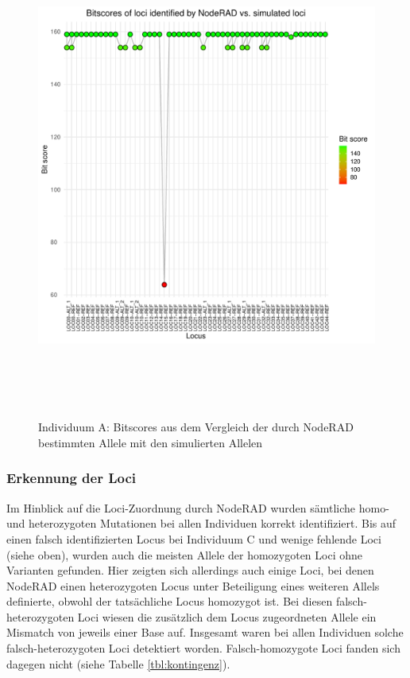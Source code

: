 \begin{figure}[H]
	\begin{center}
		\includegraphics[height=16cm]{bilder/evaluation/bitscores/A.plot_bitscores.pdf}
		\caption{Individuum A: Bitscores aus dem Vergleich der durch NodeRAD bestimmten Allele mit den simulierten Allelen}
		\label{fig:a-bitscore}
	\end{center}
\end{figure}

\subsubsection{Erkennung der Loci} \label{subsubsec:res_loci}
Im Hinblick auf die Loci-Zuordnung durch NodeRAD wurden sämtliche homo- und heterozygoten Mutationen bei allen Individuen korrekt identifiziert. Bis auf einen falsch identifizierten Locus bei Individuum C und wenige fehlende Loci (siehe oben), wurden auch die meisten Allele der homozygoten Loci ohne Varianten gefunden. Hier zeigten sich allerdings auch einige Loci, bei denen NodeRAD einen heterozygoten Locus unter Beteiligung eines weiteren Allels definierte, obwohl der tatsächliche Locus homozygot ist. Bei diesen falsch-heterozygoten Loci wiesen die zusätzlich dem Locus zugeordneten Allele ein Mismatch von jeweils einer Base auf. Insgesamt waren bei allen Individuen solche falsch-heterozygoten Loci detektiert worden. Falsch-homozygote Loci fanden sich dagegen nicht (siehe Tabelle \ref{tbl:kontingenz}).

